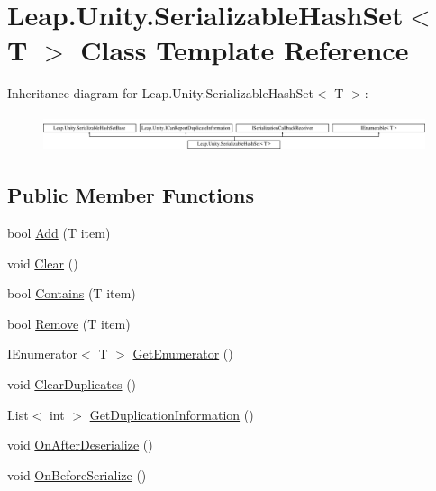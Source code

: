 \hypertarget{class_leap_1_1_unity_1_1_serializable_hash_set}{}\section{Leap.\+Unity.\+Serializable\+Hash\+Set$<$ T $>$ Class Template Reference}
\label{class_leap_1_1_unity_1_1_serializable_hash_set}
Inheritance diagram for Leap.\+Unity.\+Serializable\+Hash\+Set$<$ T $>$\+:\begin{figure}[H]
\begin{center}
\leavevmode
\includegraphics[height=1.068702cm]{class_leap_1_1_unity_1_1_serializable_hash_set}
\end{center}
\end{figure}
\subsection*{Public Member Functions}
\begin{DoxyCompactItemize}
\item 
bool \mbox{\hyperlink{class_leap_1_1_unity_1_1_serializable_hash_set_adcbfeb02f08f6dd1e3be3c61a48ca197}{Add}} (T item)
\item 
void \mbox{\hyperlink{class_leap_1_1_unity_1_1_serializable_hash_set_a54a8a46ea0b8b525ef10ef18d7e2aba6}{Clear}} ()
\item 
bool \mbox{\hyperlink{class_leap_1_1_unity_1_1_serializable_hash_set_afd24f67131e4189af190b752954a3b54}{Contains}} (T item)
\item 
bool \mbox{\hyperlink{class_leap_1_1_unity_1_1_serializable_hash_set_aa35a7b3cb3fe6ea85546859aded859d9}{Remove}} (T item)
\item 
I\+Enumerator$<$ T $>$ \mbox{\hyperlink{class_leap_1_1_unity_1_1_serializable_hash_set_a808032a7cbd3efb4c443539e1e4b3ed0}{Get\+Enumerator}} ()
\item 
void \mbox{\hyperlink{class_leap_1_1_unity_1_1_serializable_hash_set_a18418a33019aabad71aa45c18e9de587}{Clear\+Duplicates}} ()
\item 
List$<$ int $>$ \mbox{\hyperlink{class_leap_1_1_unity_1_1_serializable_hash_set_a0e117658b43a2531d8ffc15297cab253}{Get\+Duplication\+Information}} ()
\item 
void \mbox{\hyperlink{class_leap_1_1_unity_1_1_serializable_hash_set_a21160145dc04dea5c5b37940ef8e3939}{On\+After\+Deserialize}} ()
\item 
void \mbox{\hyperlink{class_leap_1_1_unity_1_1_serializable_hash_set_ae67754584f3b010df7600c4f9bbf39de}{On\+Before\+Serialize}} ()
\end{DoxyCompactItemize}
